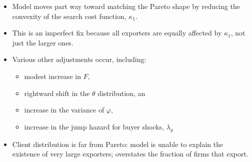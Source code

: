 \documentclass[notes=show]{beamer}
\begin{document}
\begin{frame}%



\begin{itemize}
\item Model moves part way toward matching the Pareto shape by reducing the
convexity of the search cost function, $\kappa _{1}.$

\item This is an imperfect fix because all exporters are equally affected by 
$\kappa _{1}$, not just the larger ones.

\item Various other adjustments occur, including:

\begin{itemize}
\item modest increase in $F$,

\item rightward shift in the $\theta $ distribution, an

\item increase in the variance of $\varphi ,$

\item increase in the jump hazard for buyer shocks, $\lambda _{y}$
\end{itemize}

\item Client distribution is far from Pareto: model is unable to explain the
existence of very large exporters; overstates the fraction of firms that
export.
\end{itemize}

\end{frame}%
\end{document}
